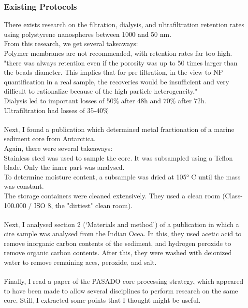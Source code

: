 \documentclass[twocolumn,a4paper,aps,amsmath,amssymb,floatfix,superscriptaddress]{revtex4-2}
\begin{document}
	\subsubsection{Existing Protocols}
	There exists research on the filtration, dialysis, and ultrafiltration retention rates using polystyrene nanospheres between 1000 and 50 nm.\cite{Assessment of nanoplastic extraction}\\
	From this research, we get several takeaways:\\
	Polymer membranes are not recommended, with retention rates far too high.\\
	"there was always retention even if the porosity was up to 50 times larger than the beads diameter. This implies that for pre-filtration, in the view to NP quantification in a real sample, the recoveries would be insufficient and very difficult to rationalize because of the high particle heterogeneity."\\
	Dialysis led to important losses of 50\% after 48h and 70\% after 72h.\\
	Ultrafiltration had losses of 35-40\%\\
	\\
	Next, I found a publication which determined metal fractionation of a marine sediment core from Antarctica.\cite{Geochemical characterization Antarctica}\\
	Again, there were several takeaways:\\
	Stainless steel was used to sample the core. It was subsampled using a Teflon blade. Only the inner part was analysed.\\
	To determine moisture content, a subsample was dried at 105° C until the mass was constant.\\
	The storage containers were cleaned extensively. They used a clean room (Class-100.000 / ISO 8, the "dirtiest" clean room\cite{cleanrooms}).\\
	\\
	Next, I analysed section 2 (`Materials and method') of a publication in which a cire sample was analysed from the Indian Ocea.\cite{Core Indian Ocean}
	In this, they used acetic acid to remove inorganic carbon contents of the sediment, and hydrogen peroxide to remove organic carbon contents. After this, they were washed with deionized water to remove remaining aces, peroxide, and salt.\\
	\\
	Finally, I read a paper of the PASADO core processing strategy, which appeared to have been made to allow several disciplines to perform research on the same core. Still, I extracted some points that I thought might be useful.\\
\end{document}
